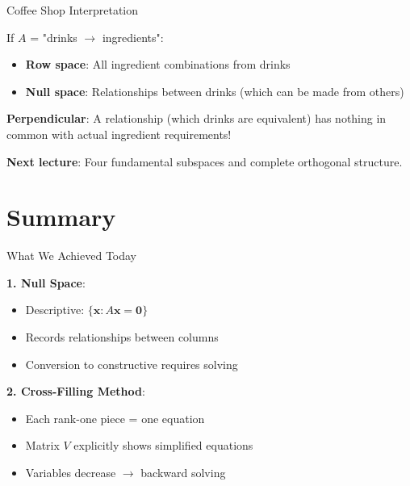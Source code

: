 \documentclass[10pt]{beamer}
\theoremstyle{definition}
\newcommand{\x}[1]{\alert{\textbf{#1}}}
\begin{document}
\begin{frame}{Coffee Shop Interpretation}

If $A$ = "drinks $\to$ ingredients":

\begin{itemize}
\item \textbf{Row space}: All ingredient combinations from drinks
\item \textbf{Null space}: Relationships between drinks (which can be made from others)
\end{itemize}

\vspace{1em}

\x{Perpendicular}: A relationship (which drinks are equivalent) has nothing in common with actual ingredient requirements!

\vspace{1em}

\x{Next lecture}: Four fundamental subspaces and complete orthogonal structure.

\end{frame}

\section{Summary}

\begin{frame}{What We Achieved Today}

\x{1. Null Space}:
\begin{itemize}
\item Descriptive: $\{\mathbf{x} : A\mathbf{x} = \mathbf{0}\}$
\item Records relationships between columns
\item Conversion to constructive requires solving
\end{itemize}

\vspace{0.5em}

\x{2. Cross-Filling Method}:
\begin{itemize}
\item Each rank-one piece = one equation
\item Matrix $V$ explicitly shows simplified equations
\item Variables decrease $\to$ backward solving
\end{itemize}

\end{frame}
\end{document}
